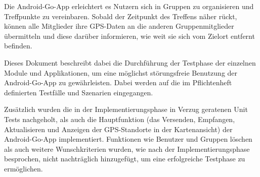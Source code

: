 Die Android-Go-App erleichtert es Nutzern sich in Gruppen zu organisieren und Treffpunkte zu vereinbaren. Sobald der Zeitpunkt des Treffens näher rückt, können alle Mitglieder ihre GPS-Daten an die anderen Gruppenmitglieder übermitteln und diese darüber informieren, wie weit sie sich vom Zielort entfernt befinden.

Dieses Dokument beschreibt dabei die Durchführung der Testphase der einzelnen Module und Applikationen, um eine möglichst störungsfreie Benutzung der Android-Go-App zu gewährleisten. Dabei werden auf die im Pflichtenheft definierten Testfälle und Szenarien eingegangen.

Zusätzlich wurden die in der Implementierungsphase in Verzug geratenen Unit Tests nachgeholt, als auch die Hauptfunktion (das Versenden, Empfangen, Aktualisieren und Anzeigen der GPS-Standorte in der Kartenansicht) der Android-Go-App implementiert. 
Funktionen wie Benutzer und Gruppen löschen als auch weitere Wunschkriterien wurden, wie nach der Implementierungsphase besprochen, nicht nachträglich hinzugefügt, um eine erfolgreiche Testphase zu ermöglichen.
